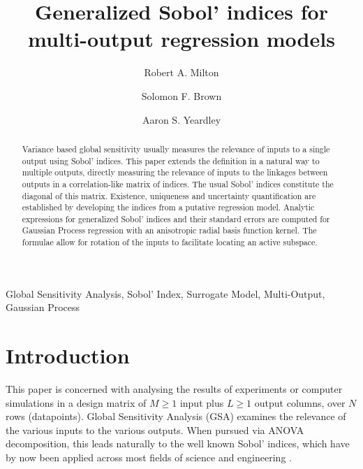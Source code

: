 \documentclass[preprint,12pt]{elsarticle}
\begin{document}
\begin{frontmatter}

    \title{Generalized Sobol' indices for multi-output regression models}

    \author{Robert A. Milton}

    \author{Solomon F. Brown}

    \author{Aaron S. Yeardley}

    \address{Department of Chemical and Biological Engineering, University of Sheffield, Sheffield, S1 3JD, United Kingdom}       

    \begin{abstract}
        Variance based global sensitivity usually measures the relevance of inputs to a single output using Sobol' indices. This paper extends the definition in a natural way to multiple outputs, directly measuring the relevance of inputs to the linkages between outputs in a correlation-like matrix of indices. The usual Sobol' indices constitute the diagonal of this matrix. Existence, uniqueness and uncertainty quantification are established by developing the indices from a putative regression model. Analytic expressions for generalized Sobol' indices and their standard errors are computed for Gaussian Process regression with an anisotropic radial basis function kernel. The formulae allow for rotation of the inputs to facilitate locating an active subspace.
    \end{abstract}

    \begin{keyword}
        Global Sensitivity Analysis, Sobol' Index, Surrogate Model, Multi-Output, Gaussian Process
    \end{keyword}

\end{frontmatter}

\section{Introduction}\label{sec:Intro}
    This paper is concerned with analysing the results of experiments or computer simulations in a design matrix of $M\geq 1$ input plus $L\geq 1$ output columns, over $N$ rows (datapoints). Global Sensitivity Analysis (GSA) \cite{Razavi2021} examines the relevance of the various inputs to the various outputs. When pursued via ANOVA decomposition, this leads naturally to the well known Sobol' indices, which have by now been applied across most fields of science and engineering \cite{Saltelli2019,Ghanem2017}. 
\end{document}
